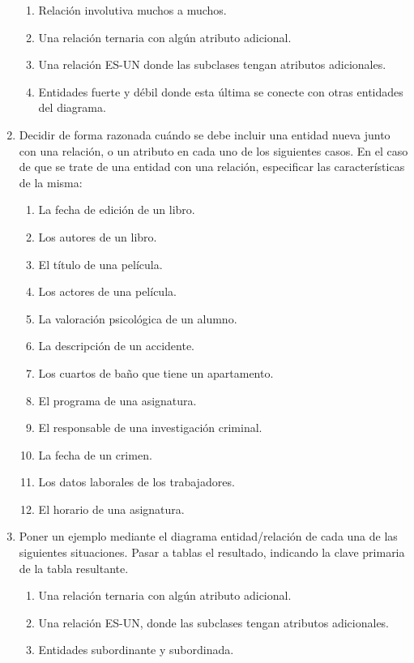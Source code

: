 \begin{enumerate}
\begin{enumerate}
        \item Relación involutiva muchos a muchos.
        \item Una relación ternaria con algún atributo adicional.
        \item Una relación ES-UN donde las subclases tengan atributos adicionales.
        \item Entidades fuerte y débil donde esta última se conecte con otras entidades del diagrama.
    \end{enumerate}
    \item Decidir de forma razonada cuándo se debe incluir una entidad nueva junto con una relación, o un atributo en cada uno de los siguientes casos. En el caso de que se trate de una entidad con una relación, especificar las características de la misma:
    \begin{enumerate}
        \item La fecha de edición de un libro.
        \item Los autores de un libro.
        \item El título de una película.
        \item Los actores de una película.
        \item La valoración psicológica de un alumno.
        \item La descripción de un accidente.
        \item Los cuartos de baño que tiene un apartamento.
        \item El programa de una asignatura.
        \item El responsable de una investigación criminal.
        \item La fecha de un crimen.
        \item Los datos laborales de los trabajadores.
        \item El horario de una asignatura.
    \end{enumerate}
    \item Poner un ejemplo mediante el diagrama entidad/relación de cada una de las siguientes situaciones. Pasar a tablas el resultado, indicando la clave primaria de la tabla resultante.
    \begin{enumerate}
        \item Una relación ternaria con algún atributo adicional.
        \item Una relación ES-UN, donde las subclases tengan atributos adicionales.
        \item Entidades subordinante y subordinada.

\end{enumerate}
\end{enumerate}
